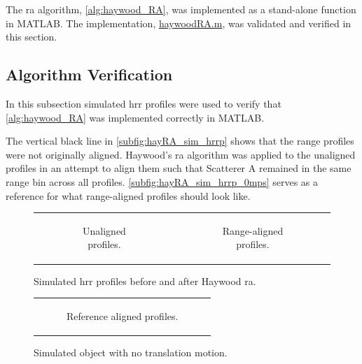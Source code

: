 \documentclass[class=report,11pt,crop=false]{standalone}
\begin{document}
    The \gls{ra} algorithm, \autoref{alg:haywood_RA}, was implemented as a stand-alone function in \textsc{MATLAB}. The implementation, \href{}{haywoodRA.m}, was validated and verified in this section.
    
    \subsection{Algorithm Verification}\label{subsec:corrRA_verification}
     In this subsection simulated \gls{hrr} profiles were used to verify that \autoref{alg:haywood_RA} was implemented correctly in \textsc{MATLAB}.

    The vertical black line in \autoref{subfig:hayRA_sim_hrrp} shows that the range profiles were not originally aligned. Haywood's \gls{ra} algorithm was applied to the unaligned profiles in an attempt to align them such that Scatterer A remained in the same range bin across all profiles. \autoref{subfig:hayRA_sim_hrrp_0mps} serves as a reference for what range-aligned profiles should look like.

    \begin{figure}[H]
    \begin{minipage}{0.6\linewidth}
        \begin{tabular}{@{}cc@{}}
            \begin{subfigure}{0.5\linewidth}
                \centering
                \resizebox{\linewidth}{!}{}
                \caption{Unaligned profiles.\label{subfig:sim_hrrp_1mps}}
            \end{subfigure}
            &
            \begin{subfigure}{0.5\linewidth}
                \centering
                \resizebox{\linewidth}{!}{}
                \caption{Range-aligned profiles.\label{subfig:hayRA_sim_hrrp}}
            \end{subfigure}
        \end{tabular}
        \caption{Simulated \gls{hrr} profiles before and after Haywood \gls{ra}. \label{subfig:hayRA_sim}}
    \end{minipage}
    \hfill
    \begin{minipage}{0.3\linewidth}
        \begin{tabular}{@{}c@{}}
            \begin{subfigure}{\linewidth}
                \centering
                \resizebox{\linewidth}{!}{}
                \caption{Reference aligned profiles.\label{subfig:hayRA_sim_hrrp_0mps}}
            \end{subfigure}
        \end{tabular}
        \caption{Simulated object with no translation motion. \label{fig:sim_0mps}}
    \end{minipage}
    \end{figure}
\end{document}
